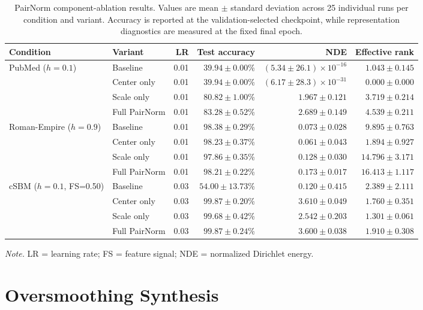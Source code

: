 \documentclass[english]{lni}
\begin{document}
\begin{landscape}
\begin{table}[p]
\centering
\caption{PairNorm component-ablation results. Values are mean $\pm$ standard deviation across 25 individual runs per condition and variant. Accuracy is reported at the validation-selected checkpoint, while representation diagnostics are measured at the fixed final epoch.}
\label{tab:pairnorm-ablation}
\small
\begin{tabular}{llrrrr}
\toprule
Condition & Variant & LR & Test accuracy &
NDE & Effective rank\\
\midrule
PubMed ($h=0.1$) &
Baseline & 0.01 & $39.94\pm0.00$\% &
$(5.34\pm26.1)\times10^{-16}$ & $1.043\pm0.145$\\
&
Center only & 0.01 & $39.94\pm0.00$\% &
$(6.17\pm28.3)\times10^{-31}$ & $0.000\pm0.000$\\
&
Scale only & 0.01 & $80.82\pm1.00$\% &
$1.967\pm0.121$ & $3.719\pm0.214$\\
&
Full PairNorm & 0.01 & $83.28\pm0.52$\% &
$2.689\pm0.149$ & $4.539\pm0.211$\\
\midrule
Roman-Empire ($h=0.9$) &
Baseline & 0.01 & $98.38\pm0.29$\% &
$0.073\pm0.028$ & $9.895\pm0.763$\\
&
Center only & 0.01 & $98.23\pm0.37$\% &
$0.061\pm0.043$ & $1.894\pm0.927$\\
&
Scale only & 0.01 & $97.86\pm0.35$\% &
$0.128\pm0.030$ & $14.796\pm3.171$\\
&
Full PairNorm & 0.01 & $98.21\pm0.22$\% &
$0.173\pm0.017$ & $16.413\pm1.117$\\
\midrule
cSBM ($h=0.1$, FS=0.50) &
Baseline & 0.03 & $54.00\pm13.73$\% &
$0.120\pm0.415$ & $2.389\pm2.111$\\
&
Center only & 0.03 & $99.87\pm0.20$\% &
$3.610\pm0.049$ & $1.760\pm0.351$\\
&
Scale only & 0.03 & $99.68\pm0.42$\% &
$2.542\pm0.203$ & $1.301\pm0.061$\\
&
Full PairNorm & 0.03 & $99.87\pm0.24$\% &
$3.600\pm0.038$ & $1.910\pm0.308$\\
\bottomrule
\end{tabular}

\smallskip
\parbox{\linewidth}{\footnotesize
\textit{Note.} LR = learning rate; FS = feature signal;
NDE = normalized Dirichlet energy. 
}
\end{table}
\end{landscape}

\section{Oversmoothing Synthesis}
\label{sec:oversmoothing-synthesis}
\end{document}
